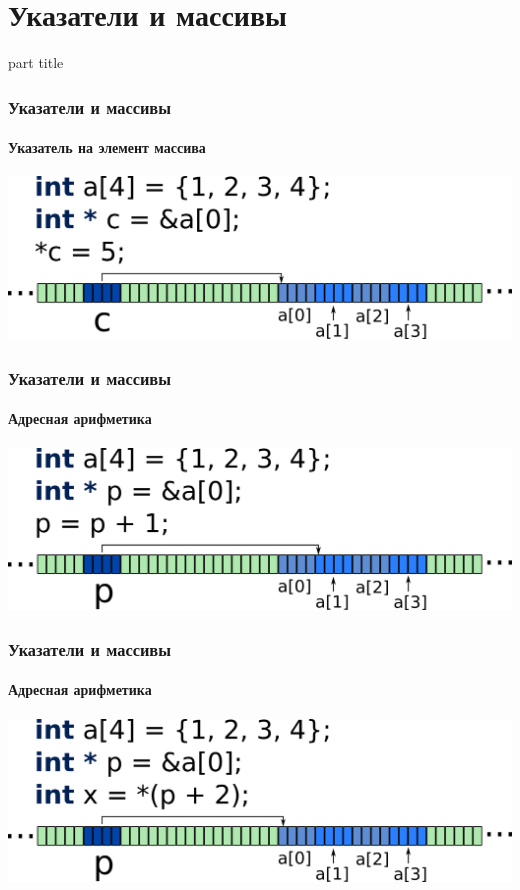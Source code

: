 \documentclass[14pt,pdf,hyperref={unicode}]{beamer}
\begin{document}
\section{Указатели и массивы}
\begin{frame}
\begin{center}
\begin{beamercolorbox}[sep=8pt,center]{part
title}
\insertsection
\end{beamercolorbox}
\end{center}
\end{frame}

\begin{frame}[fragile]
\frametitle{Указатели и массивы} 
\framesubtitle{Указатель на элемент массива}
\begin{center}
\includegraphics[width=0.95\linewidth]{images/memory_parrays_1.png}
\end{center}
\end{frame}

\begin{frame}[fragile]
\frametitle{Указатели и массивы} 
\framesubtitle{Адресная арифметика}
\begin{center}
\includegraphics[width=0.95\linewidth]{images/memory_parrays_2.png}
\end{center}
\end{frame}

\begin{frame}[fragile]
\frametitle{Указатели и массивы} 
\framesubtitle{Адресная арифметика}
\begin{center}
\includegraphics[width=0.95\linewidth]{images/memory_parrays_3.png}
\end{center}
\end{frame}
\end{document}
